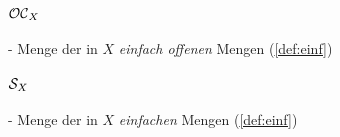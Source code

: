     \paragraph{$\mathcal{OC}_X$} - \quad Menge der in $X$ \textit{einfach offenen} Mengen (\ref{def:einf})

    \paragraph{$\mathcal{S}_X$} - \quad Menge der in $X$ \textit{einfachen} Mengen (\ref{def:einf})


% 
%     
% 
%     
%     
%     
